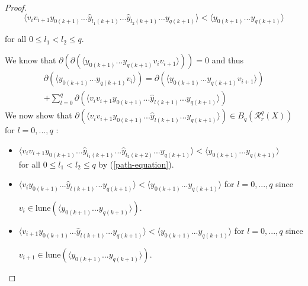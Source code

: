 \documentclass[10pt,a4paper]{amsart}
\newcommand\lune{\mathrm{lune}}
\newcommand\rvr{\mathcal{R}}
\begin{document}
\begin{proof}
\begin{equation}
\langle v_{i}v_{i+1}y_{0(k+1)}...\hat{y}_{l_1(k+1)}...\hat{y}_{l_2(k+1)}...y_{q(k+1)} \rangle < \langle y_{0(k+1)}...y_{q(k+1)} \rangle 
\label{path-equation}
\end{equation}

for all $0 \leq l_1 < l_2 \leq q$.

We know that $\partial (\partial (\langle y_{0(k+1)}...y_{q(k+1)} v_{i}v_{i+1} \rangle )) = 0$ and thus 
\begin{equation}
\begin{aligned}
    \partial (\langle y_{0(k+1)}...y_{q(k+1)} v_{i} \rangle ) = 
    \partial (\langle y_{0(k+1)}...y_{q(k+1)} v_{i+1} \rangle) \\ + \sum_{l=0}^{q}\partial (\langle v_{i}v_{i+1}y_{0(k+1)}...\hat{y}_{l(k+1)}...y_{q(k+1)} \rangle)
    \end{aligned}
    \label{q-equation-general-proof}
\end{equation}
We now show that $\partial (\langle v_{i}v_{i+1}y_{0(k+1)}...\hat{y}_{l(k+1)}...y_{q(k+1)} \rangle) \in B_{q}(\rvr_{r}^{q}(X))$ for $l = 0,...,q$ :

\begin{itemize}
    \item $\langle v_{i}v_{i+1}y_{0(k+1)}...\hat{y}_{l_{1}(k+1)}...\hat{y}_{l_{2}(k+2)}...y_{q(k+1)} \rangle < \langle y_{0(k+1)}...y_{q(k+1)} \rangle$ \\ for all $0 \leq l_1 < l_2 \leq q$ by (\ref{path-equation}). 

    \item $\langle v_{i} y_{0(k+1)}...\hat{y}_{l(k+1)}...y_{q(k+1)} \rangle < \langle y_{0(k+1)}...y_{q(k+1)} \rangle $ for $l =0,...,q$ since 
    
    \vspace{3pt}
    $v_{i} \in \lune (\langle y_{0(k+1)}...y_{q(k+1)} \rangle)$. 

    \item $\langle v_{i+1} y_{0(k+1)}...\hat{y}_{l(k+1)}...y_{q(k+1)} \rangle < \langle y_{0(k+1)}...y_{q(k+1)} \rangle $ for $l =0,...,q$ since 
    
    \vspace{3pt}
    $v_{i+1} \in \lune (\langle y_{0(k+1)}...y_{q(k+1)} \rangle)$.
    
\end{itemize}


\end{proof}
\end{document}
